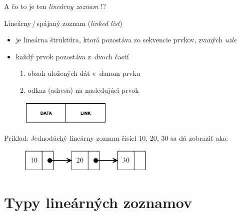 \documentclass[slovak, 11pt]{beamer}
\begin{document}
\begin{frame}{A čo to je ten \emph{lineárny zoznam} !?}
    \begin{block}{Lineárny\,/\,spájaný zoznam (\emph{linked list})}
        \begin{itemize}
            \item je lineárna štruktúra, ktorá pozostáva zo sekvencie prvkov, zvaných \emph{uzle}
            \item každý prvok pozostáva z~dvoch častí
            \begin{enumerate}
                \item obsah uložených dát v~danom prvku
                \item odkaz (adresa) na nasledujúci prvok
            \end{enumerate}
        \end{itemize}
        \begin{figure}[h]
          \vspace{-40pt}
          \includegraphics[width=4.5cm,right]{linked_list_1.png} 
        \end{figure}
    \end{block}
    \begin{exampleblock}{Príklad:}
        Jednodúchý lineárny zoznam čísiel 10, 20, 30 sa dá zobraziť ako:
        \begin{figure}[h]
          \includegraphics[width=6.5cm,center]{linked_list_2.jpg} 
        \end{figure}
    \end{exampleblock}
\end{frame}


\section{Typy lineárných zoznamov}
\end{document}
